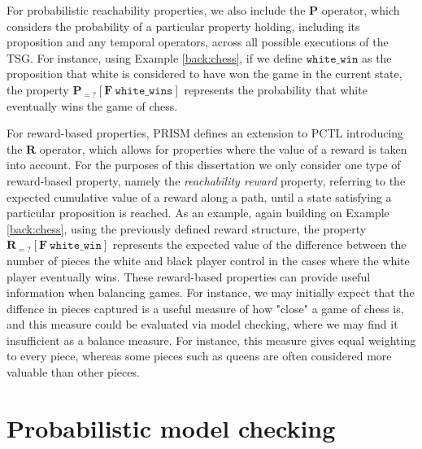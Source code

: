 For probabilistic reachability properties, we also include the $\mathbf{P}$ operator, which considers the probability of a particular property holding, including its proposition and any temporal operators, across all possible executions of the TSG. For instance, using Example \ref{back:chess}, if we define $\mathtt{white\_win}$ as the proposition that white is considered to have won the game in the current state, the property $\mathbf{P}_{=?} [\mathbf{F}\ \mathtt{white\_wins}]$ represents the probability that white eventually wins the game of chess.

For reward-based properties, PRISM defines an extension to PCTL introducing the $\mathbf{R}$ operator, which allows for properties where the value of a reward is taken into account. For the purposes of this dissertation we only consider one type of reward-based property, namely the \emph{reachability reward} property, referring to the expected cumulative value of a reward along a path, until a state satisfying a particular proposition is reached. As an example, again building on Example \ref{back:chess}, using the previously defined reward structure, the property $\mathbf{R}_{=?} [\mathbf{F}\ \mathtt{white\_win}]$ represents the expected value of the difference between the number of pieces the white and black player control in the cases where the white player eventually wins. These reward-based properties can provide useful information when balancing games. For instance, we may initially expect that the diffence in pieces captured is a useful measure of how "close" a game of chess is, and this measure could be evaluated via model checking, where we may find it insufficient as a balance measure. For instance, this measure gives equal weighting to every piece, whereas some pieces such as queens are often considered more valuable than other pieces.

\section{Probabilistic model checking}
\label{back:prob_mod_check}



